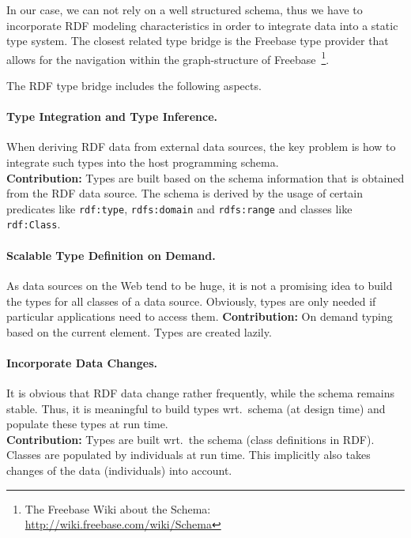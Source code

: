 \documentclass{llncs} %
\begin{document}
In our case, we can not rely on a well structured schema, thus we have to
incorporate RDF modeling characteristics in order to integrate data into
a static type system. The closest related type bridge is the Freebase  
type provider that allows for the navigation within the graph-structure of
Freebase~\footnote{The Freebase Wiki about the Schema: \url{http://wiki.freebase.com/wiki/Schema}}.

The RDF type bridge includes the following aspects.


\paragraph*{\bf Type Integration and Type Inference.}
When deriving RDF data from external data sources, the key problem is how to integrate
such types into the host programming schema. \\
\textbf{Contribution:} Types are built based on the schema information that is obtained
from the RDF data source. The schema is derived by the 
usage of certain predicates like \texttt{rdf:type}, \texttt{rdfs:domain} and \texttt{rdfs:range}
and classes like \texttt{rdf:Class}.

\paragraph{\bf Scalable Type Definition on Demand.}
As data sources on the Web tend to be huge, it is not a promising idea to
build the types for all classes of a data source.
Obviously, types are only needed if particular applications need to access them.
\textbf{Contribution:} On demand typing based on the current element. Types are created lazily. \\


\paragraph*{\bf Incorporate Data Changes.}
It is obvious that RDF data change rather frequently, while the
schema remains stable. Thus, it is meaningful to build types wrt.\ schema (at design time)
and populate these types at run time.\\
\textbf{Contribution:} Types are built wrt.\ the schema (class definitions in RDF).
Classes are populated by individuals at run time.
This implicitly also takes changes of the data (individuals) into account. \\


\end{document}

